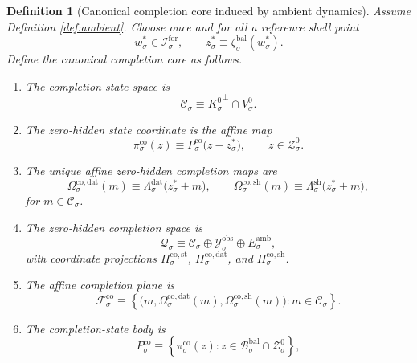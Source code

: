 \documentclass[11pt]{article}
\newcommand{\ForSpace}[1]{\mathcal I_{#1}^{\mathrm{for}}}
\newcommand{\DataSpace}[1]{\mathcal Y_{#1}^{\mathrm{obs}}}
\newcommand{\AmbientTarget}[1]{E_{#1}^{\mathrm{amb}}}
\newcommand{\BalBody}[1]{\mathcal B_{#1}^{\mathrm{bal}}}
\newcommand{\BalData}[1]{\Lambda_{#1}^{\mathrm{dat}}}
\newcommand{\BalShell}[1]{\Lambda_{#1}^{\mathrm{sh}}}
\newcommand{\ZeroHiddenSlice}[1]{\mathcal Z_{#1}^{0}}
\newcommand{\ZeroHiddenVec}[1]{V_{#1}^{0}}
\newcommand{\Kernel}[1]{K_{#1}^{0}}
\newcommand{\BalEmbed}[1]{\zeta_{#1}^{\mathrm{bal}}}
\newcommand{\ReferencePoint}[1]{z_{#1}^{\ast}}
\newcommand{\StateComp}[1]{P_{#1}^{\mathrm{co}}}
\newcommand{\CoreState}[1]{\mathcal C_{#1}}
\newcommand{\CoreSpace}[1]{\mathcal Q_{#1}}
\newcommand{\CoreAffine}[1]{\mathcal F_{#1}^{\mathrm{co}}}
\newcommand{\CoreStateBody}[1]{P_{#1}^{\mathrm{co}}}
\newcommand{\CoreStateProj}[1]{\Pi_{#1}^{\mathrm{co,st}}}
\newcommand{\CoreDataProj}[1]{\Pi_{#1}^{\mathrm{co,dat}}}
\newcommand{\CoreShellProj}[1]{\Pi_{#1}^{\mathrm{co,sh}}}
\newcommand{\CoreCoord}[1]{\pi_{#1}^{\mathrm{co}}}
\newcommand{\CoreDataMap}[1]{\Omega_{#1}^{\mathrm{co,dat}}}
\newcommand{\CoreShellMap}[1]{\Omega_{#1}^{\mathrm{co,sh}}}
\newtheorem{definition}{Definition}
\begin{document}
\begin{definition}[Canonical completion core induced by ambient dynamics]
\label{def:canonical}
Assume Definition \ref{def:ambient}. Choose once and for all a reference shell point
\[
w_{\sigma}^{\ast}\in\ForSpace{\sigma},
\qquad
\ReferencePoint{\sigma}\equiv \BalEmbed{\sigma}(w_{\sigma}^{\ast}).
\]
Define the canonical completion core as follows.
\begin{enumerate}
    \item The completion-state space is
    \[
    \CoreState{\sigma}
    \equiv
    {\Kernel{\sigma}}^{\perp}\cap\ZeroHiddenVec{\sigma}.
    \]
    \item The zero-hidden state coordinate is the affine map
    \begin{equation}
    \CoreCoord{\sigma}(z)
    \equiv
    \StateComp{\sigma}\bigl(z-\ReferencePoint{\sigma}\bigr),
    \qquad
    z\in\ZeroHiddenSlice{\sigma}.
    \label{eq:corecoord}
    \end{equation}
    \item The unique affine zero-hidden completion maps are
    \begin{equation}
    \CoreDataMap{\sigma}(m)
    \equiv
    \BalData{\sigma}\bigl(\ReferencePoint{\sigma}+m\bigr),
    \qquad
    \CoreShellMap{\sigma}(m)
    \equiv
    \BalShell{\sigma}\bigl(\ReferencePoint{\sigma}+m\bigr),
    \label{eq:coremaps}
    \end{equation}
    for \(m\in\CoreState{\sigma}\).
    \item The zero-hidden completion space is
    \[
    \CoreSpace{\sigma}
    \equiv
    \CoreState{\sigma}\oplus\DataSpace{\sigma}\oplus\AmbientTarget{\sigma},
    \]
    with coordinate projections \(\CoreStateProj{\sigma}\), \(\CoreDataProj{\sigma}\), and \(\CoreShellProj{\sigma}\).
    \item The affine completion plane is
    \begin{equation}
    \CoreAffine{\sigma}
    \equiv
    \left\{
    \bigl(
    m,
    \CoreDataMap{\sigma}(m),
    \CoreShellMap{\sigma}(m)
    \bigr):
    m\in\CoreState{\sigma}
    \right\}.
    \label{eq:coreplane}
    \end{equation}
    \item The completion-state body is
    \begin{equation}
    \CoreStateBody{\sigma}
    \equiv
    \left\{
    \CoreCoord{\sigma}(z):
    z\in\BalBody{\sigma}\cap\ZeroHiddenSlice{\sigma}
    \right\},
    \label{eq:corestatebody}
    \end{equation}

\end{enumerate}
\end{definition}
\end{document}
